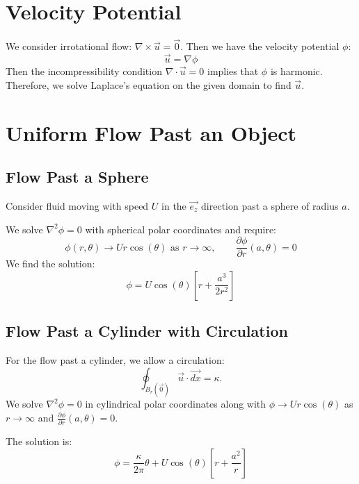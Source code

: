 \documentclass[../Main.tex]{subfiles}
\begin{document}
\section{Velocity Potential}
We consider irrotational flow: $\nabla \times \vec{u} = \vec0$. Then we have the velocity potential $\phi$:
\begin{equation*}
    \vec{u} = \nabla \phi
\end{equation*}
Then the incompressibility condition $\nabla \cdot \vec{u} = 0$ implies that $\phi$ is harmonic. Therefore, we solve Laplace's equation on the given domain to find $\vec{u}$.
\section{Uniform Flow Past an Object}
\subsection{Flow Past a Sphere}
Consider fluid moving with speed $U$ in the $\vec{e_z}$ direction past a sphere of radius $a$.

We solve $\nabla^2 \phi = 0$ with spherical polar coordinates and require:
\begin{equation*}
    \phi(r, \theta) \to Ur\cos(\theta) \text{ as } r \to \infty,\qquad \frac{\partial \phi}{\partial r}(a, \theta) = 0
\end{equation*}
We find the solution:
\begin{equation*}
    \phi = U\cos(\theta) \left[r + \frac{a^3}{2r^2}\right]
\end{equation*}
\subsection{Flow Past a Cylinder with Circulation}
For the flow past a cylinder, we allow a circulation:
\begin{equation*}
    \oint_{B_r(\vec{0})} \vec{u} \cdot \vec{dx} = \kappa.
\end{equation*}
We solve $\nabla^2 \phi = 0$ in cylindrical polar coordinates along with $\phi \to Ur\cos(\theta)$ as $r \to \infty$ and $\frac{\partial \phi}{\partial r}(a, \theta) = 0$.

The solution is:
\begin{equation*}
    \phi = \frac{\kappa}{2\pi} \theta + U\cos(\theta) \left[r + \frac{a^2}{r}\right]
\end{equation*}
\end{document}
